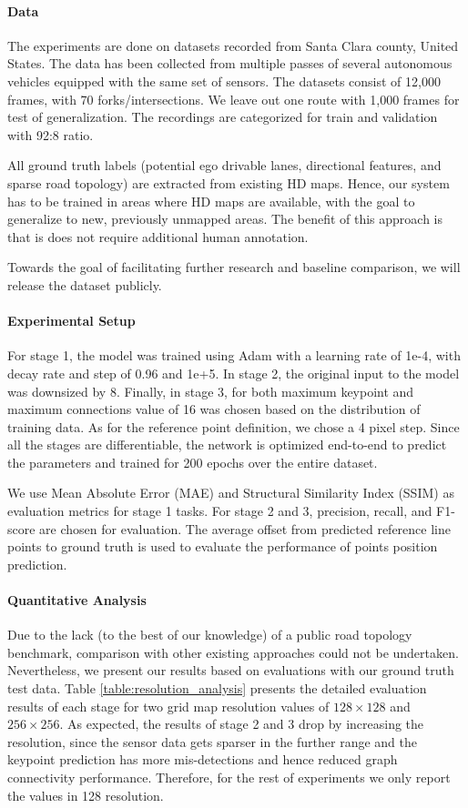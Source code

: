 \documentclass[10pt,twocolumn,letterpaper]{article}
\begin{document}
\paragraph{Data} The experiments are done on datasets recorded from Santa Clara county, United States. The data has been collected from multiple passes of several autonomous vehicles equipped with the same set of sensors. The datasets consist of 12,000 frames, with 70 forks/intersections. We leave out one route with 1,000 frames for test of generalization. The recordings are categorized for train and validation with 92:8 ratio.

All ground truth labels (potential ego drivable lanes, directional features, and sparse road topology) are extracted from existing HD maps. Hence, our system has to be trained in areas where HD maps are available, with the goal to generalize to new, previously unmapped areas. The benefit of this approach is that is does not require additional human annotation.

Towards the goal of facilitating further research and baseline comparison, we will release the dataset publicly.
\paragraph{Experimental Setup} For stage 1, the model was trained using Adam with a learning rate of 1e-4, with decay rate and step of 0.96 and 1e+5. In stage 2, the original input to the model was downsized by 8. Finally, in stage 3, for both maximum keypoint and maximum connections value of 16 was chosen based on the distribution of training data. As for the reference point definition, we chose a 4 pixel step. Since all the stages are differentiable, the network is optimized end-to-end to predict the parameters and trained for 200 epochs over the entire dataset.

We use Mean Absolute Error (MAE) and Structural Similarity Index (SSIM) as evaluation metrics for stage 1 tasks. For stage 2 and 3, precision, recall, and F1-score are chosen for evaluation. The average offset from predicted reference line points to ground truth is used to evaluate the performance of points position prediction.
\paragraph{Quantitative Analysis} Due to the lack (to the best of our knowledge) of a public road topology benchmark, comparison with other existing approaches could not be undertaken. Nevertheless, we present our results based on evaluations with our ground truth test data. Table \ref{table:resolution_analysis} presents the detailed evaluation results of each stage for two grid map resolution values of $128\times 128$ and $256\times 256$. As expected, the results of stage 2 and 3 drop by increasing the resolution, since the sensor data gets sparser in the further range and the keypoint prediction has more mis-detections and hence reduced graph connectivity performance. Therefore, for the rest of experiments we only report the values in 128 resolution.
\end{document}
